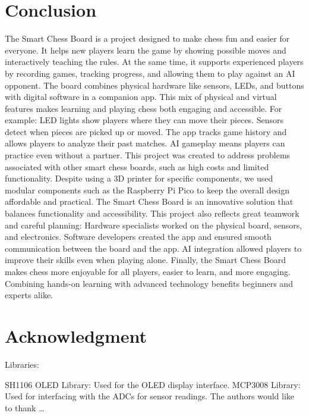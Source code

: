 \documentclass[11pt,journal]{IEEEtran}
\begin{document}
\section{Conclusion}
The Smart Chess Board is a project designed to make chess fun and easier for everyone. It helps new players learn the game by showing possible moves and interactively teaching the rules. At the same time, it supports experienced players by recording games, tracking progress, and allowing them to play against an AI opponent.
The board combines physical hardware like sensors, LEDs, and buttons with digital software in a companion app. This mix of physical and virtual features makes learning and playing chess both engaging and accessible. For example:
LED lights show players where they can move their pieces.
Sensors detect when pieces are picked up or moved.
The app tracks game history and allows players to analyze their past matches.
AI gameplay means players can practice even without a partner.
This project was created to address problems associated with other smart chess boards, such as high costs and limited functionality. Despite using a 3D printer for specific components, we used modular components such as the Raspberry Pi Pico to keep the overall design affordable and practical. The Smart Chess Board is an innovative solution that balances functionality and accessibility.
This project also reflects great teamwork and careful planning:
Hardware specialists worked on the physical board, sensors, and electronics.
Software developers created the app and ensured smooth communication between the board and the app.
AI integration allowed players to improve their skills even when playing alone.
Finally, the Smart Chess Board makes chess more enjoyable for all players, easier to learn, and more engaging. Combining hands-on learning with advanced technology benefits beginners and experts alike.




\section*{Acknowledgment}
Libraries:

SH1106 OLED Library: Used for the OLED display interface.
MCP3008 Library: Used for interfacing with the ADCs for sensor readings.
The authors would like to thank \ldots




\end{document}
